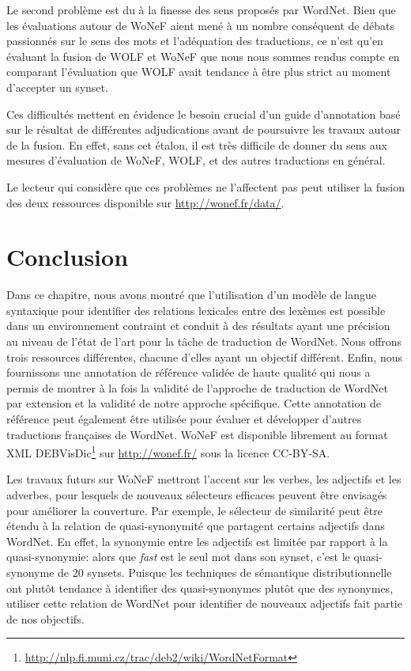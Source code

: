 Le second problème est du à la finesse des sens proposés par WordNet. Bien que
les évaluations autour de WoNeF aient mené à un nombre conséquent de débats
passionnés sur le sens des mots et l'adéquation des traductions, ce n'est qu'en
évaluant la fusion de WOLF et WoNeF que nous nous sommes rendus compte en
comparant l'évaluation que WOLF avait tendance à être plus strict au moment
d'accepter un synset.

Ces difficultés mettent en évidence le besoin crucial d'un guide d'annotation
basé sur le résultat de différentes adjudications avant de poursuivre les
travaux autour de la fusion. En effet, sans cet étalon, il est très difficile
de donner du sens aux mesures d'évaluation de WoNeF, WOLF, et des autres
traductions en général.

Le lecteur qui considère que ces problèmes ne l'affectent pas peut utiliser la
fusion des deux ressources disponible sur \url{http://wonef.fr/data/}.

\section*{Conclusion}

Dans ce chapitre, nous avons montré que l'utilisation d'un modèle de langue
syntaxique pour identifier des relations lexicales entre des lexèmes est
possible dans un environnement contraint et conduit à des résultats ayant une
précision au niveau de l'état de l'art pour la tâche de traduction de WordNet.
Nous offrons trois ressources différentes, chacune d'elles ayant un objectif
différent. Enfin, nous fournissons une annotation de référence validée de haute
qualité qui nous a permis de montrer à la fois la validité de l'approche de
traduction de WordNet par extension et la validité de notre approche
spécifique. Cette annotation de référence peut également être utilisée pour
évaluer et développer d'autres traductions françaises de WordNet. WoNeF est
disponible librement au format XML
DEBVisDic\footnote{\url{http://nlp.fi.muni.cz/trac/deb2/wiki/WordNetFormat}}
sur \url{http://wonef.fr/} sous la licence CC-BY-SA.

Les travaux futurs sur WoNeF mettront l'accent sur les verbes, les adjectifs et
les adverbes, pour lesquels de nouveaux sélecteurs efficaces peuvent être
envisagés pour améliorer la couverture. Par exemple, le sélecteur de similarité
peut être étendu à la relation de quasi-synonymité que partagent certains
adjectifs dans WordNet. En effet, la synonymie entre les adjectifs est limitée
par rapport à la quasi-synonymie: alors que \textit{fast} est le seul mot dans
son synset, c'est le quasi-synonyme de 20 synsets. Puisque les techniques de
sémantique distributionnelle ont plutôt tendance à identifier des
quasi-synonymes plutôt que des synonymes, utiliser cette relation de WordNet
pour identifier de nouveaux adjectifs fait partie de nos objectifs.

